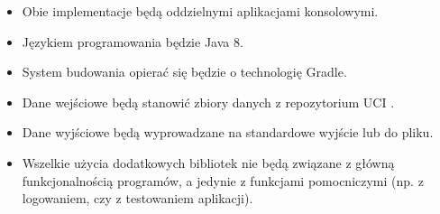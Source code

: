 \begin{itemize}
  \item Obie implementacje będą oddzielnymi aplikacjami konsolowymi.
  \item Językiem programowania będzie Java 8.
  \item System budowania opierać się będzie o technologię Gradle.
  \item Dane wejściowe będą stanowić zbiory danych z repozytorium UCI \cite{UCI}.
  \item Dane wyjściowe będą wyprowadzane na standardowe wyjście lub do pliku.
  \item Wszelkie użycia dodatkowych bibliotek nie będą związane z główną funkcjonalnością programów, a jedynie z funkcjami pomocniczymi (np. z logowaniem, czy z testowaniem aplikacji).
\end{itemize}
